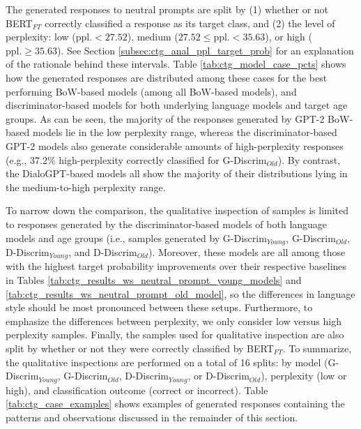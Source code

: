 The generated responses to neutral prompts are split by (1) whether or not BERT$_{FT}$ correctly classified a response as its target class, and (2) the level of perplexity: low ($\text{ppl.} < 27.52$), medium ($27.52 \leq \text{ppl.} < 35.63$), or high ($\text{ppl.} \geq 35.63$). See Section \ref{subsec:ctg_anal_ppl_target_prob} for an explanation of the rationale behind these intervals. Table \ref{tab:ctg_model_case_pcts} shows how the generated responses are distributed among these cases for the best performing BoW-based models (among all BoW-based models), and discriminator-based models for both underlying language models and target age groups. As can be seen, the majority of the responses generated by GPT-2 BoW-based models lie in the low perplexity range, whereas the discriminator-based GPT-2 models also generate considerable amounts of high-perplexity responses (e.g., 37.2\% high-perplexity correctly classified for G-Discrim$_{Old}$). By contrast, the DialoGPT-based models all show the majority of their distributions lying in the medium-to-high perplexity range.

To narrow down the comparison, the qualitative inspection of samples is limited to responses generated by the discriminator-based models of both language models and age groups (i.e., samples generated by G-Discrim$_{Young}$, G-Discrim$_{Old}$, D-Discrim$_{Young}$, and D-Discrim$_{Old}$). Moreover, these models are all among those with the highest target probability improvements over their respective baselines in Tables \ref{tab:ctg_results_ws_neutral_prompt_young_models} and \ref{tab:ctg_results_ws_neutral_prompt_old_model}, so the differences in language style should be most pronounced between these setups. Furthermore, to emphasize the differences between perplexity, we only consider low versus high perplexity samples. Finally, the samples used for qualitative inspection are also split by whether or not they were correctly classified by BERT$_{FT}$. To summarize, the qualitative inspections are performed on a total of 16 splits: by model (G-Discrim$_{Young}$, G-Discrim$_{Old}$, D-Discrim$_{Young}$, or D-Discrim$_{Old}$), perplexity (low or high), and classification outcome (correct or incorrect). Table \ref{tab:ctg_case_examples} shows examples of generated responses containing the patterns and observations discussed in the remainder of this section.

